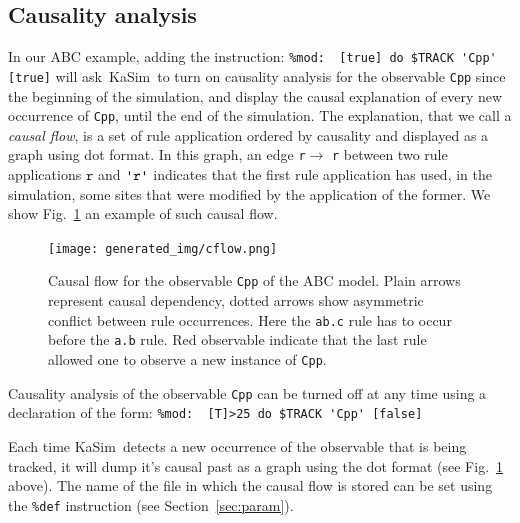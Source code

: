 \documentclass[11pt]{book}
\def\KaSim{\textsf{KaSim}}
\def\ttt#1{\texttt{#1}}
\def\noi{\noindent}
\begin{document}
\subsection{Causality analysis}\label{sec:cflows}

In our ABC example, adding the instruction:
\lstinline[language=kappa]!%mod:  [true] do $TRACK 'Cpp' [true]!
\noi will ask~\KaSim~to turn on causality analysis for the observable \ttt{{\textquotesingle}Cpp{\textquotesingle}} since the beginning of the simulation, and display the causal explanation of every new occurrence of \ttt{{\textquotesingle}Cpp{\textquotesingle}}, until the end of the simulation. The explanation, that we call a \emph{causal flow}, is a set of rule application ordered by causality and displayed as a graph using dot format. In this graph, an edge \ttt{r}$\longrightarrow$ \ttt{r{\textquotesingle}} between two rule applications $\ttt{r}$ and $\ttt{{\textquotesingle}r{\textquotesingle}}$ indicates that the first rule application has used, in the simulation, some sites that were modified by the application of the former. We show Fig.~\ref{fig:cflow} an example of such causal flow.

\begin{figure}[htbp]
\begin{center}
\texttt{[image: generated\_img/cflow.png]}
\caption{Causal flow for the observable \ttt{{\textquotesingle}Cpp{\textquotesingle}} of the ABC model. Plain arrows represent causal dependency, dotted arrows show asymmetric conflict between rule occurrences. Here the \ttt{{\textquotesingle}ab.c{\textquotesingle}} rule has to occur before the \ttt{{\textquotesingle}a.b{\textquotesingle}} rule. Red observable indicate that the last rule allowed one to observe a new instance of \ttt{{\textquotesingle}Cpp{\textquotesingle}}.}
\label{fig:cflow}
\end{center}
\end{figure}

Causality analysis of the observable \ttt{Cpp} can be turned off at any time using a declaration of the form:
\lstinline[language=kappa]!%mod:  [T]>25 do $TRACK 'Cpp' [false]!

Each time \KaSim~detects a new occurrence of the observable that is being tracked, it will dump it's causal past as a graph using the dot format (see Fig.~\ref{fig:cflow} above). The name of the file in which the causal flow is stored can be set using the \texttt{\%def} instruction (see Section~\ref{sec:param}). 
\end{document}
